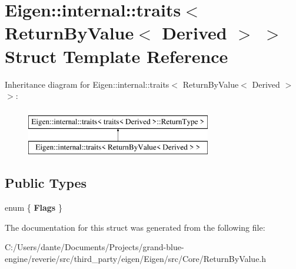 \hypertarget{struct_eigen_1_1internal_1_1traits_3_01_return_by_value_3_01_derived_01_4_01_4}{}\section{Eigen\+::internal\+::traits$<$ Return\+By\+Value$<$ Derived $>$ $>$ Struct Template Reference}
\label{struct_eigen_1_1internal_1_1traits_3_01_return_by_value_3_01_derived_01_4_01_4}
Inheritance diagram for Eigen\+::internal\+::traits$<$ Return\+By\+Value$<$ Derived $>$ $>$\+:\begin{figure}[H]
\begin{center}
\leavevmode
\includegraphics[height=2.000000cm]{struct_eigen_1_1internal_1_1traits_3_01_return_by_value_3_01_derived_01_4_01_4}
\end{center}
\end{figure}
\subsection*{Public Types}
\begin{DoxyCompactItemize}
\item 
\mbox{\label{struct_eigen_1_1internal_1_1traits_3_01_return_by_value_3_01_derived_01_4_01_4_ad26d1b4aa76b82e496e7fe9c2ca321ba}} 
enum \{ {\bfseries Flags}
 \}
\end{DoxyCompactItemize}


The documentation for this struct was generated from the following file\+:\begin{DoxyCompactItemize}
\item 
C\+:/\+Users/dante/\+Documents/\+Projects/grand-\/blue-\/engine/reverie/src/third\+\_\+party/eigen/\+Eigen/src/\+Core/Return\+By\+Value.\+h\end{DoxyCompactItemize}
